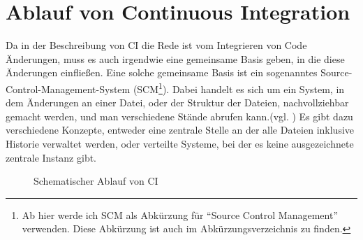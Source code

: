 \section{Ablauf von Continuous Integration}
Da in der Beschreibung von CI die Rede ist vom Integrieren von Code Änderungen, muss es auch irgendwie eine gemeinsame Basis geben, in die diese Änderungen einfließen. Eine solche gemeinsame Basis ist ein sogenanntes Source-Control-Management-System (SCM\footnote{Ab hier werde ich SCM als Abkürzung für "`Source Control Management"' verwenden. Diese Abkürzung ist auch im Abkürzungsverzeichnis zu finden.}). Dabei handelt es sich um ein System, in dem Änderungen an einer Datei, oder der Struktur der Dateien, nachvollziehbar gemacht werden, und man verschiedene Stände abrufen kann.(vgl. \cite{fowler-CI}) Es gibt dazu verschiedene Konzepte, entweder eine zentrale Stelle an der alle Dateien inklusive Historie verwaltet werden, oder verteilte Systeme, bei der es keine ausgezeichnete zentrale Instanz gibt.\\
\begin{figure}[h]
  \centering
  \caption{Schematischer Ablauf von CI}\label{fig:Schema-aufbau}
\end{figure}
